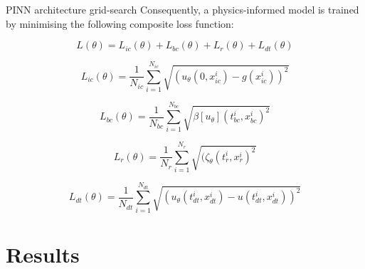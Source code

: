 \documentclass[serif,8pt, aspectratio=169]{beamer}
\begin{document}
\begin{frame}[fragile]{PINN architecture grid-search}
    Consequently, a physics-informed model is trained by minimising the following composite loss function:
    
    \begin{equation}
       \textit{L}(\theta ) = \textit{L}_{ic}(\theta )+\textit{L}_{bc}(\theta )+\textit{L}_{r}(\theta )+\textit{L}_{dt}(\theta )
    \end{equation}
    
    \begin{equation}
        \textit{L}_{ic}(\theta )=\frac{1}{N_{ic}}\sum^{N_{ic}}_{i=1}\sqrt{(u_\theta(0,x_{ic}^i)-g(x_{ic}^i))^2}
    \end{equation}

    \begin{equation}
        \textit{L}_{bc}(\theta )=\frac{1}{N_{bc}}\sum^{N_{bc}}_{i=1}\sqrt{\beta[u_\theta](t^{i}_{bc},x^i_{bc})^2}
    \end{equation}

    \begin{equation}
        \textit{L}_{r}(\theta )=\frac{1}{N_{r}}\sum^{N_{r}}_{i=1}\sqrt{(\zeta_\theta(t^i_{r},x^i_{r})^2}
    \end{equation}

    \begin{equation}
        \textit{L}_{dt}(\theta )=\frac{1}{N_{dt}}\sum^{N_{dt}}_{i=1}\sqrt{(u_\theta(t^i_{dt},x_{dt}^i)-u(t^i_{dt},x_{dt}^i))^2}
    \end{equation}

\end{frame}


\section{Results}
\end{document}
